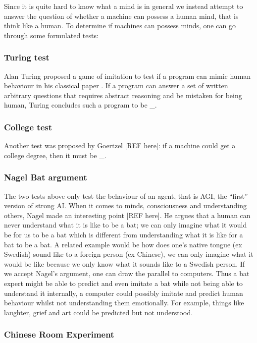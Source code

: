 \documentclass[11pt]{article}
\begin{document}
Since it is quite hard to know what a mind is in general we instead attempt to answer the question of whether a machine can possess a human mind, that is think like a human. To determine if machines can possess minds, one can go through some formulated tests:

\subsubsection{Turing test}

Alan Turing proposed a game of imitation to test if a program can mimic human behaviour in his classical paper \cite{turing1950computing}. If a program can answer a set of written arbitrary questions that requires abstract reasoning and be mistaken for being human, Turing concludes such a program to be \_.

\subsubsection{College test}

Another test was proposed by Goertzel [REF here]: if a machine could get a college degree, then it must be \_.

\subsubsection{Nagel Bat argument}

The two tests above only test the behaviour of an agent, that is AGI, the “first” version of strong AI. When it comes to minds, consciousness and understanding others, Nagel made an interesting point [REF here]. He argues that a human can never understand what it is like to be a bat; we can only imagine what it would be for us to be a bat which is different from understanding what it is like for a bat to be a bat. A related example would be how does one’s native tongue (ex Swedish) sound like to a foreign person (ex Chinese), we can only imagine what it would be like because we only know what it sounds like to a Swedish person. If we accept Nagel’s argument, one can draw the parallel to computers. Thus a bat expert might be able to predict and even imitate a bat while not being able to understand it internally, a computer could possibly imitate and predict human behaviour whilst not understanding them emotionally. For example, things like laughter, grief and art could be predicted but not understood.

\subsubsection{Chinese Room Experiment}
\end{document}
